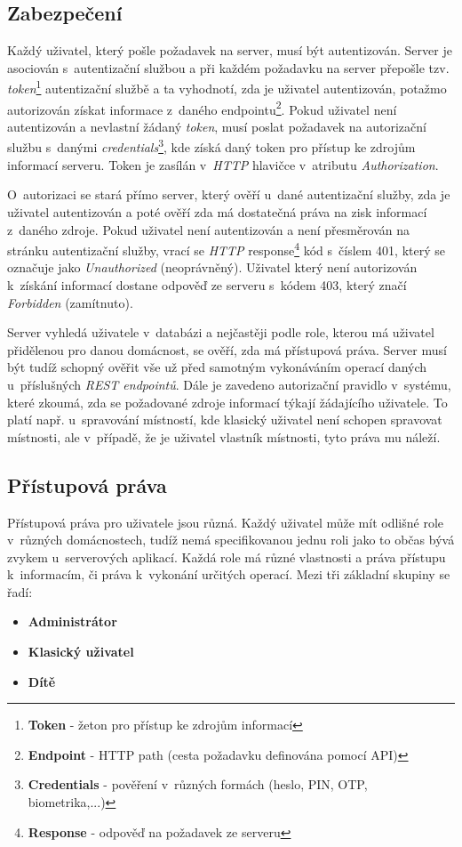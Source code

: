 \subsection*{Zabezpečení}
\label{backend:bezpecnost}
Každý uživatel, který pošle požadavek na server, musí být autentizován.
Server je asociován s~autentizační službou a při každém požadavku na server přepošle tzv. \emph{token}\footnote{\textbf{Token} - žeton pro přístup ke zdrojům informací} autentizační službě
a ta vyhodnotí, zda je uživatel autentizován, potažmo autorizován získat informace z~daného endpointu\footnote{\textbf{Endpoint} - HTTP path (cesta požadavku definována pomocí API)}.
Pokud uživatel není autentizován a nevlastní žádaný \emph{token}, musí poslat požadavek na autorizační službu s~danými \emph{credentials}\footnote{\textbf{Credentials} - pověření v~různých formách (heslo, PIN, OTP, biometrika,...)},
kde získá daný token pro přístup ke zdrojům informací serveru. Token je zasílán v~\emph{HTTP} hlavičce v~atributu \emph{Authorization}.

O~autorizaci se stará přímo server, který ověří u~dané autentizační služby, zda je uživatel autentizován a poté ověří zda má dostatečná práva na zisk informací z~daného zdroje.
Pokud uživatel není autentizován a není přesměrován na stránku autentizační služby, vrací se \emph{HTTP} response\footnote{\textbf{Response} - odpověď na požadavek ze serveru} kód s~číslem 401, který se označuje jako \emph{Unauthorized} (neoprávněný).
Uživatel který není autorizován k~získání informací dostane odpověď ze serveru s~kódem 403, který značí \emph{Forbidden} (zamítnuto).

Server vyhledá uživatele v~databázi a nejčastěji podle role, kterou má uživatel přidělenou pro danou domácnost, se ověří, zda má přístupová práva.
Server musí být tudíž schopný ověřit vše už před samotným vykonáváním operací daných u~příslušných \emph{REST endpointů}.
Dále je zavedeno autorizační pravidlo v~systému, které zkoumá, zda se požadované zdroje informací týkají žádajícího uživatele.
To platí např. u~spravování místností, kde klasický uživatel není schopen spravovat místnosti, ale v~případě, že je uživatel vlastník místnosti, tyto práva mu náleží.

\subsection*{Přístupová práva}
\label{backend:prava}
Přístupová práva pro uživatele jsou různá. Každý uživatel může mít odlišné role v~různých domácnostech, tudíž nemá specifikovanou jednu roli jako to občas bývá zvykem u~serverových aplikací.
Každá role má různé vlastnosti a práva přístupu k~informacím, či práva k~vykonání určitých operací.
\newline
Mezi tři základní skupiny se řadí:
\begin{itemize}
  \item \textbf{Administrátor}
  \item \textbf{Klasický uživatel}
  \item \textbf{Dítě}
\end{itemize}

